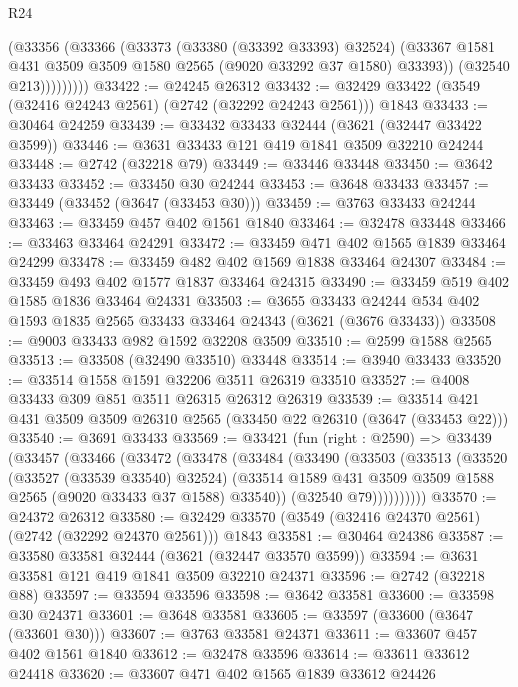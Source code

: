 \begin{lexlean}{R24}
\begin{coremodule}
                (@33356
                  (@33366
                    (@33373
                      (@33380 (@33392 @33393) @32524)
                      (@33367 @1581 @431 @3509 @3509 @1580 @2565 (@9020 @33292 @37 @1580) @33393))
                    (@32540 @213)))))))))
@33422 := @24245 @26312
@33432 := @32429 @33422 (@3549 (@32416 @24243 @2561) (@2742 (@32292 @24243 @2561))) @1843
@33433 := @30464 @24259
@33439 := @33432 @33433 @32444 (@3621 (@32447 @33422 @3599))
@33446 := @3631 @33433 @121 @419 @1841 @3509 @32210 @24244
@33448 := @2742 (@32218 @79)
@33449 := @33446 @33448
@33450 := @3642 @33433
@33452 := @33450 @30 @24244
@33453 := @3648 @33433
@33457 := @33449 (@33452 (@3647 (@33453 @30)))
@33459 := @3763 @33433 @24244
@33463 := @33459 @457 @402 @1561 @1840
@33464 := @32478 @33448
@33466 := @33463 @33464 @24291
@33472 := @33459 @471 @402 @1565 @1839 @33464 @24299
@33478 := @33459 @482 @402 @1569 @1838 @33464 @24307
@33484 := @33459 @493 @402 @1577 @1837 @33464 @24315
@33490 := @33459 @519 @402 @1585 @1836 @33464 @24331
@33503 := @3655
    @33433
    @24244
    @534
    @402
    @1593
    @1835
    @2565
    @33433
    @33464
    @24343
    (@3621 (@3676 @33433))
@33508 := @9003 @33433 @982 @1592 @32208 @3509
@33510 := @2599 @1588 @2565
@33513 := @33508 (@32490 @33510) @33448
@33514 := @3940 @33433
@33520 := @33514 @1558 @1591 @32206 @3511 @26319 @33510
@33527 := @4008 @33433 @309 @851 @3511 @26315 @26312 @26319
@33539 := @33514 @421 @431 @3509 @3509 @26310 @2565 (@33450 @22 @26310 (@3647 (@33453 @22)))
@33540 := @3691 @33433
@33569 := @33421
    (fun (right : @2590) =>
    @33439
      (@33457
        (@33466
          (@33472
            (@33478
              (@33484
                (@33490
                  (@33503
                    (@33513
                      (@33520
                        (@33527 (@33539 @33540) @32524)
                        (@33514 @1589 @431 @3509 @3509 @1588 @2565 (@9020 @33433 @37 @1588) @33540))
                      (@32540 @79))))))))))
@33570 := @24372 @26312
@33580 := @32429 @33570 (@3549 (@32416 @24370 @2561) (@2742 (@32292 @24370 @2561))) @1843
@33581 := @30464 @24386
@33587 := @33580 @33581 @32444 (@3621 (@32447 @33570 @3599))
@33594 := @3631 @33581 @121 @419 @1841 @3509 @32210 @24371
@33596 := @2742 (@32218 @88)
@33597 := @33594 @33596
@33598 := @3642 @33581
@33600 := @33598 @30 @24371
@33601 := @3648 @33581
@33605 := @33597 (@33600 (@3647 (@33601 @30)))
@33607 := @3763 @33581 @24371
@33611 := @33607 @457 @402 @1561 @1840
@33612 := @32478 @33596
@33614 := @33611 @33612 @24418
@33620 := @33607 @471 @402 @1565 @1839 @33612 @24426

\end{coremodule}
\end{lexlean}
